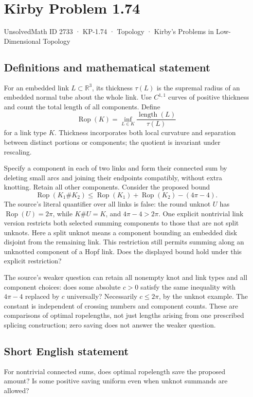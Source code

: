 \documentclass[11pt,a4paper]{article}
\begin{document}
\section*{Kirby Problem 1.74}\label{2733}
{\small UnsolvedMath ID 2733 · KP-1.74 · Topology · Kirby's Problems in Low-Dimensional Topology}
\subsection{Definitions and mathematical statement}
For an embedded link $L\subset\mathbb R^3$, its thickness $\tau(L)$ is the supremal radius of an embedded normal tube about the whole link. Use $C^{1,1}$ curves of positive thickness and count the total length of all components. Define
\[
\operatorname{Rop}(K)=\inf_{L\in K}\frac{\operatorname{length}(L)}{\tau(L)}
\]
for a link type $K$. Thickness incorporates both local curvature and separation between distinct portions or components; the quotient is invariant under rescaling.

Specify a component in each of two links and form their connected sum by deleting small arcs and joining their endpoints compatibly, without extra knotting. Retain all other components. Consider the proposed bound
\[
\operatorname{Rop}(K_1\#K_2)\le
\operatorname{Rop}(K_1)+\operatorname{Rop}(K_2)-(4\pi-4).
\]
The source's literal quantifier over all links is false: the round unknot $U$ has $\operatorname{Rop}(U)=2\pi$, while $K\#U=K$, and $4\pi-4>2\pi$.
One explicit nontrivial link version restricts both selected summing components to those that are not split unknots. Here a split unknot means a component bounding an embedded disk disjoint from the remaining link. This restriction still permits summing along an unknotted component of a Hopf link. Does the displayed bound hold under this explicit restriction?

The source's weaker question can retain all nonempty knot and link types and all component choices: does some absolute $c>0$ satisfy the same inequality with $4\pi-4$ replaced by $c$ universally? Necessarily $c\leq2\pi$, by the unknot example. The constant is independent of crossing numbers and component counts. These are comparisons of optimal ropelengths, not just lengths arising from one prescribed splicing construction; zero saving does not answer the weaker question.
\subsection{Short English statement}
For nontrivial connected sums, does optimal ropelength save the proposed amount? Is some positive saving uniform even when unknot summands are allowed?
\end{document}
